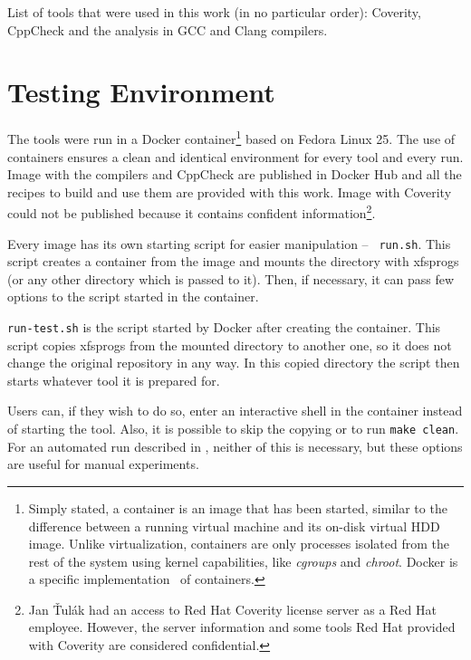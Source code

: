 List of tools that were used in this work (in no particular order): Coverity,
CppCheck and the analysis in GCC and Clang compilers.


\section{Testing Environment}\label{chap:techniques:env}

The tools were run in a Docker container\footnote{Simply stated, a
	container is an image that has been started, similar to the
		difference between a running virtual machine and its
		on-disk virtual HDD image. Unlike virtualization,
		containers are only processes isolated from the rest of the
system using kernel capabilities, like {\em cgroups} and {\em chroot}.
Docker is a specific implementation~\cite{docker} of containers.} based on Fedora Linux
25. The use of containers ensures a clean and identical environment for
every tool and every run. Image with the compilers and CppCheck are published
in Docker Hub and all the recipes to build and use them are provided with
this work. Image with Coverity could not be published because it contains
confident information\footnote{Jan Ťulák had an access to Red Hat Coverity license
server as a Red Hat employee. However, the server information and some tools
	Red Hat provided with Coverity are considered confidential.}.

Every image has its own starting script for easier manipulation -- {\tt
run.sh}.  This script creates a container from the image and mounts the
directory with xfsprogs (or any other directory which is passed to it).
Then, if necessary, it can pass few options to the script started in
the container.

{\tt run-test.sh} is the script started by Docker after creating the container.
This script copies xfsprogs from the mounted directory to another one, so it
does not change the original repository in any way. In this copied directory
the script then starts whatever tool it is prepared for.

Users can, if they wish to do so, enter an interactive shell in the container
instead of starting the tool. Also, it is possible to skip the copying or to
run {\tt make clean}. For an automated run described in
, neither of this is necessary, but these
options are useful for manual experiments.


